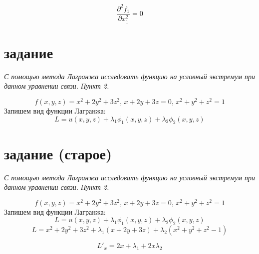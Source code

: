 \documentclass[a5paper, 10pt]{article}
\theoremstyle{definition}
\theoremstyle{plain}
\theoremstyle{remark}
\begin{document}
\begin{equation}
\frac{\partial ^ 2 f_1}{\partial x_1^2} = 0
\end{equation}










\newpage

\section{задание}
\textit{С помощью метода Лагранжа исследовать функцию на условный экстремум при данном уравнении связи. Пункт 2.}

\begin{equation}
f(x, y, z) = x^2+2y^2+3z^2, \, x + 2y+3z=0, \, x^2 +y^2+z^2=1
\end{equation}
Запишем вид функции Лагранжа:
\begin{equation}
L = u(x, y, z) + \lambda_1 \phi_1 (x, y, z) + \lambda_2 \phi_2 (x, y, z)
\end{equation}
















\newpage

\section{задание (старое)}
\textit{С помощью метода Лагранжа исследовать функцию на условный экстремум при данном уравнении связи. Пункт 2.}

\begin{equation}
f(x, y, z) = x^2+2y^2+3z^2, \, x + 2y+3z=0, \, x^2 +y^2+z^2=1
\end{equation}
Запишем вид функции Лагранжа:
\begin{equation}
L = u(x, y, z) + \lambda_1 \phi_1 (x, y, z) + \lambda_2 \phi_2 (x, y, z)
\end{equation}
\begin{equation}
L =  x^2+2y^2+3z^2 + \lambda_1 ( x + 2y+3z) + \lambda_2 (x^2 +y^2+z^2 - 1)
\end{equation}

\begin{equation}
L'_x =  2x+ \lambda_1  + 2x \lambda_2
\end{equation}
\end{document}

